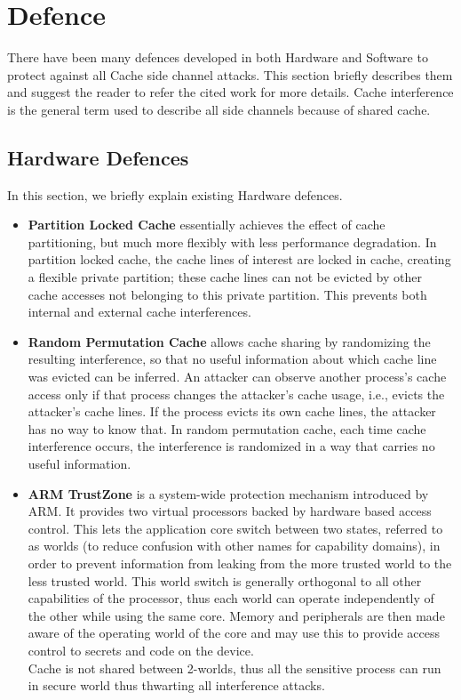 \documentclass[twocolumn]{IEEEtran}
\begin{document}
\section {Defence}
There have been many defences developed in both Hardware and Software to protect against all Cache side channel attacks. This section briefly describes them and suggest the reader to refer the cited work for more details. Cache interference is the general term used to describe all side channels because of shared cache.
\subsection {Hardware Defences}
In this section, we briefly explain existing Hardware defences\cite{wang2007new}.
\begin{itemize}
\item \textbf {Partition Locked Cache} essentially achieves the effect of cache partitioning, but much more flexibly with less performance degradation. In partition locked cache, the cache lines of interest are locked in cache, creating a flexible private partition; these cache lines can not be evicted by other cache accesses not belonging to this private partition. This prevents both internal and external cache interferences.

\item \textbf {Random Permutation Cache} allows cache sharing by randomizing the resulting interference, so that no useful information about which cache line was evicted can be inferred. An attacker can observe another process’s cache access only if that process changes the attacker’s cache usage, i.e., evicts the attacker’s cache lines. If the process evicts its own cache lines, the attacker has no way to know that.  In random permutation cache, each time cache interference occurs, the interference is randomized in a way that carries no useful information. 

\item \textbf{ARM TrustZone}\cite{frenzel2010arm} is a system-wide protection mechanism introduced by ARM. It provides two virtual processors backed by hardware based access control. This lets the application core switch between two states, referred to as worlds (to reduce confusion with other names for capability domains), in order to prevent information from leaking from the more trusted world to the less trusted world. This world switch is generally orthogonal to all other capabilities of the processor, thus each world can operate independently of the other while using the same core. Memory and peripherals are then made aware of the operating world of the core and may use this to provide access control to secrets and code on the device. \\
Cache is not shared between 2-worlds, thus all the sensitive process can run in secure world thus thwarting all interference attacks.

\end{itemize}
\end{document}
